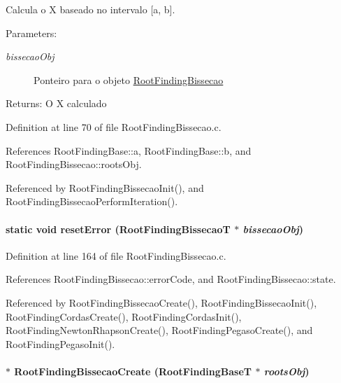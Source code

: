 Calcula o X baseado no intervalo \mbox{[}a, b\mbox{]}. 

\begin{Desc}
\item[Parameters:]
\begin{description}
\item[{\em bissecaoObj}]Ponteiro para o objeto \hyperlink{structRootFindingBissecao}{RootFindingBissecao} \end{description}
\end{Desc}
\begin{Desc}
\item[Returns:]O X calculado \end{Desc}


Definition at line 70 of file RootFindingBissecao.c.

References RootFindingBase::a, RootFindingBase::b, and RootFindingBissecao::rootsObj.

Referenced by RootFindingBissecaoInit(), and RootFindingBissecaoPerformIteration().\hypertarget{group____bissecao_g4dc0dd2ead3960f74572fc6d3afbe8a7}{
\paragraph[resetError]{\setlength{\rightskip}{0pt plus 5cm}static void resetError ({\bf RootFindingBissecaoT} $\ast$ {\em bissecaoObj})}\hfill}
\label{group____bissecao_g4dc0dd2ead3960f74572fc6d3afbe8a7}




Definition at line 164 of file RootFindingBissecao.c.

References RootFindingBissecao::errorCode, and RootFindingBissecao::state.

Referenced by RootFindingBissecaoCreate(), RootFindingBissecaoInit(), RootFindingCordasCreate(), RootFindingCordasInit(), RootFindingNewtonRhapsonCreate(), RootFindingPegasoCreate(), and RootFindingPegasoInit().\hypertarget{group____bissecao_g01fb79a4dd7e1f53eb1233f262528f66}{
\paragraph[RootFindingBissecaoCreate]{$\ast$ RootFindingBissecaoCreate ({\bf RootFindingBaseT} $\ast$ {\em rootsObj})}\hfill}
\label{group____bissecao_g01fb79a4dd7e1f53eb1233f262528f66}


